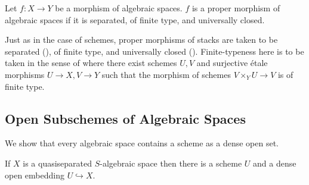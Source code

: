 \begin{definition}\label{def: proper morphism of algebraic spaces}
    Let $f:X\to Y$ be a morphism of algebraic spaces. $f$ is a proper morphism of algebraic spaces if it is separated, of finite type, and universally closed. 
\end{definition}
\begin{remark}
    Just as in the case of schemes, proper morphisms of stacks are taken to be separated (), of finite type, and universally closed (). Finite-typeness here is to be taken in the sense of  where there exist schemes $U,V$ and surjective \'{e}tale morphisms $U\to X, V\to Y$ such that the morphism of schemes $V\times_{Y}U\to V$ is of finite type. 
\end{remark}
\subsection{Open Subschemes of Algebraic Spaces}
We show that every algebraic space contains a scheme as a dense open set. 
\begin{theorem}\label{thm: every algebraic space has a dense open subscheme}
    If $X$ is a quasiseparated $S$-algebraic space then there is a scheme $U$ and a dense open embedding $U\hookrightarrow X$. 
\end{theorem}